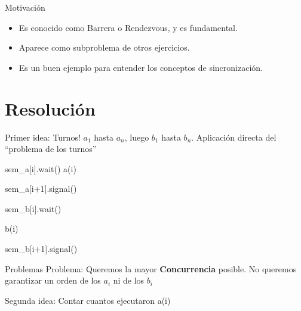 \documentclass[pdf]{beamer}
\newcommand{\quotes}[1]{``#1''}
\begin{document}
\begin{frame}{Motivación}
    \begin{itemize}
        \item Es conocido como Barrera o Rendezvous, y es fundamental.
        \vspace{1em}
        \item Aparece como subproblema de otros ejercicios.
        \vspace{1em}
        \item Es un buen ejemplo para entender los conceptos de sincronización. 
    \end{itemize}
\end{frame}

\section{Resolución}
\begin{frame}
    Primer idea: \pause Turnos! 
    \pause 
    \newline $a_1$ hasta $a_n$, luego $b_1$ hasta $b_n$.
    Aplicación directa del \quotes{problema de los turnos}
    
    \vspace{2em}
    
    \pause
    \begin{algorithmic}
    
         
            \State sem\_a[i].wait()
            \vspace{1em}
            \State a(i)
            \vspace{1em}
            
            \State sem\_a[i+1].signal()
            \vspace{1em}
            
            \State sem\_b[i].wait()
            \vspace{1em}
            
            \State b(i)
            \vspace{1em}
            
            \State sem\_b[i+1].signal()
        
        \EndFunction
        
    \end{algorithmic}
    
    \pause
\end{frame}

\begin{frame}{Problemas}
    Problema: Queremos la mayor \textbf{Concurrencia} posible. 
    No queremos garantizar un orden de los $a_i$ ni de los $b_i$ 
    
    \vspace{2em}
    
    \pause
    
    Segunda idea: Contar cuantos ejecutaron a(i)
\end{frame}
\end{document}
